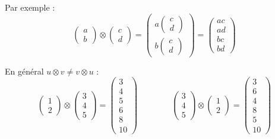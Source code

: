 \documentclass[11pt,class=report,crop=false]{standalone}
\begin{document}
Par exemple :
$$\begin{pmatrix}a\\b\end{pmatrix}\otimes\begin{pmatrix}c\\d\end{pmatrix}
= \begin{pmatrix}a\begin{pmatrix}c\\d\end{pmatrix}\\b\begin{pmatrix}c\\d\end{pmatrix}\end{pmatrix}
= \begin{pmatrix}ac\\ad\\bc\\bd\end{pmatrix}$$

En général $u \otimes v \neq v \otimes u$ :
$$\begin{pmatrix}1\\2\end{pmatrix} \otimes \begin{pmatrix}3\\4\\5\end{pmatrix}
= \begin{pmatrix}3\\4\\5\\6\\8\\10\end{pmatrix}
\qquad\qquad
\begin{pmatrix}3\\4\\5\end{pmatrix} \otimes \begin{pmatrix}1\\2\end{pmatrix}
= \begin{pmatrix}3\\6\\4\\8\\5\\10\end{pmatrix}$$


\end{document}
